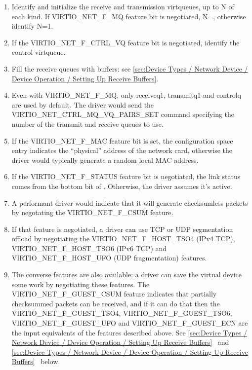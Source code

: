 \begin{enumerate}
\item Identify and initialize the receive and
  transmission virtqueues, up to N of each kind. If
  VIRTIO_NET_F_MQ feature bit is negotiated,
  N=, otherwise identify N=1.

\item If the VIRTIO_NET_F_CTRL_VQ feature bit is negotiated,
  identify the control virtqueue.

\item Fill the receive queues with buffers: see \ref{sec:Device Types / Network Device / Device Operation / Setting Up Receive Buffers}.

\item Even with VIRTIO_NET_F_MQ, only receiveq1, transmitq1 and
  controlq are used by default.  The driver would send the
  VIRTIO_NET_CTRL_MQ_VQ_PAIRS_SET command specifying the
  number of the transmit and receive queues to use.

\item If the VIRTIO_NET_F_MAC feature bit is set, the configuration
  space  entry indicates the ``physical'' address of the
  network card, otherwise the driver would typically generate a random
  local MAC address.

\item If the VIRTIO_NET_F_STATUS feature bit is negotiated, the link
  status comes from the bottom bit of .
  Otherwise, the driver assumes it's active.

\item A performant driver would indicate that it will generate checksumless
  packets by negotating the VIRTIO_NET_F_CSUM feature.

\item If that feature is negotiated, a driver can use TCP or UDP
  segmentation offload by negotiating the VIRTIO_NET_F_HOST_TSO4 (IPv4
  TCP), VIRTIO_NET_F_HOST_TSO6 (IPv6 TCP) and VIRTIO_NET_F_HOST_UFO
  (UDP fragmentation) features.

\item The converse features are also available: a driver can save
  the virtual device some work by negotiating these features.
   The VIRTIO_NET_F_GUEST_CSUM feature indicates that partially
  checksummed packets can be received, and if it can do that then
  the VIRTIO_NET_F_GUEST_TSO4, VIRTIO_NET_F_GUEST_TSO6,
  VIRTIO_NET_F_GUEST_UFO and VIRTIO_NET_F_GUEST_ECN are the input
  equivalents of the features described above.
  See \ref{sec:Device Types / Network Device / Device Operation / Setting Up Receive Buffers}~ and \ref{sec:Device Types / Network Device / Device Operation / Setting Up Receive Buffers}~ below.
\end{enumerate}

